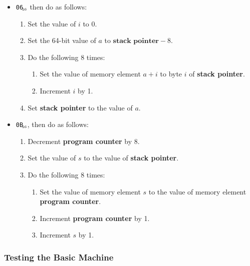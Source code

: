 \documentclass[a4paper,11pt]{article}
\newcommand{\PC}{\textbf{program counter}\xspace}
\newcommand{\SP}{\textbf{stack pointer}\xspace}
\newcommand{\num}[1]{\texttt{#1}\xspace}
\newcommand{\hex}[1]{\num{#1}$_{\textup{\tiny\hskip-1ex 16}}$\xspace}
\newcommand{\op}[1]{#1}
\newcommand{\GETSP}    [1]{\op{\hex{06}}\xspace}
\newcommand{\PUSHL}    [1]{\op{\hex{0B}}\xspace}
\begin{document}
\begin{enumerate}
\begin{itemize}
\begin{enumerate}
    \item Set the value of $i$ to 0.
    \item Decrement \SP by 8.
    \item Set the 64-bit value $a$ to \SP.
    \item Do the following 8 times:
      \begin{enumerate}
      \item Set memory element $a+i$ to byte $i$ of \PC.
      \item Increment $i$ by 1.
      \end{enumerate}
    \end{enumerate}
  \item \GETSP, then do as follows:
    \begin{enumerate}
    \item Set the value of $i$ to 0.
    \item Set the 64-bit value of $a$ to $\SP - 8$.
    \item Do the following 8 times:
      \begin{enumerate}
      \item Set the value of memory element $a + i$ to byte $i$ of \SP.
      \item Increment $i$ by 1.
      \end{enumerate}
    \item Set \SP to the value of $a$.
    \end{enumerate}
  \item \PUSHL{}, then do as follows:
    \begin{enumerate}
    \item Decrement \PC by 8.
    \item Set the value of $s$ to the value of \SP.
    \item Do the following 8 times:
      \begin{enumerate}
      \item Set the value of memory element $s$ to the value of memory element \PC.
      \item Increment \PC by 1.
      \item Increment $s$ by 1.
      \end{enumerate}
    \end{enumerate}
  \end{itemize}
\end{enumerate}

\subsubsection{Testing the Basic Machine}
\end{document}
